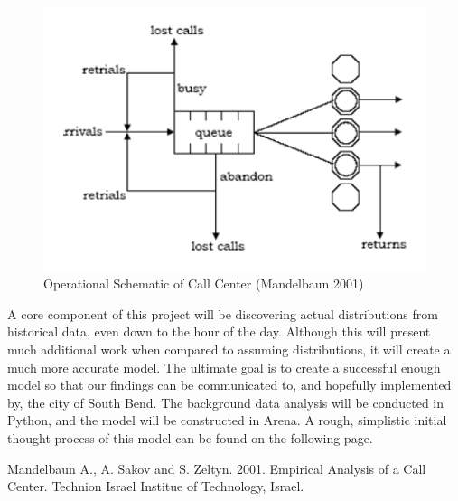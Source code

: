 \documentclass[11pt,twocolumn]{article}
\begin{document}
\begin{figure}[h]
	\includegraphics[scale=.45]{call_center_layout.png}
	\caption{Operational Schematic of Call Center (Mandelbaun 2001)}
\end{figure}

A core component of this project will be discovering actual distributions from historical data, even down to the hour of the day.  Although this will present much additional work when compared to assuming distributions, it will create a much more accurate model.  The ultimate goal is to create a successful enough model so that our findings can be communicated to, and hopefully implemented by, the city of South Bend.  The background data analysis will be conducted in Python, and the model will be constructed in Arena.  A rough, simplistic initial thought process of this model can be found on the following page.

\begin{thebibliography}{5}

Mandelbaun A., A. Sakov and S. Zeltyn. 2001. Empirical Analysis of a Call Center. Technion Israel Institue of Technology, Israel.

\end{thebibliography}
\newpage
\clearpage

\end{document}
